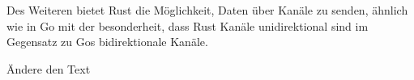 \begin{figure}[htp]
    \centering
    
    \label{fig:rust_threads}
\end{figure}

Des Weiteren bietet Rust die Möglichkeit, Daten über Kanäle zu senden, ähnlich
wie in Go mit der besonderheit, dass Rust Kanäle unidirektional sind im Gegensatz
zu Gos bidirektionale Kanäle. \autocite{ChannelsRustExample}

Ändere den Text